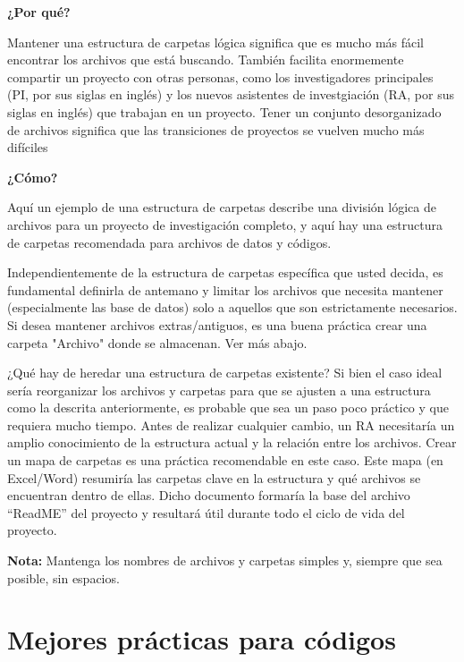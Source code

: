 \documentclass[11pt,en]{elegantpaper}
\begin{document}
\textbf{¿Por qué?} 

Mantener una estructura de carpetas lógica significa que es mucho más fácil encontrar los archivos que está buscando. También facilita enormemente compartir un proyecto con otras personas, como los investigadores principales (PI, por sus siglas en inglés) y los nuevos asistentes de investgiación (RA, por sus siglas en inglés) que trabajan en un proyecto. Tener un conjunto desorganizado de archivos significa que las transiciones de proyectos se vuelven mucho más difíciles


\textbf{¿Cómo?}

Aquí un ejemplo de una estructura de carpetas describe una división lógica de archivos para un proyecto de investigación completo, y aquí hay una estructura de carpetas recomendada para archivos de datos y códigos. 

Independientemente de la estructura de carpetas específica que usted decida, es fundamental definirla de antemano y limitar los archivos que necesita mantener (especialmente las base de datos) solo a aquellos que son estrictamente necesarios. Si desea mantener archivos extras/antiguos, es una buena práctica crear una carpeta "Archivo" donde se almacenan. Ver más abajo.

¿Qué hay de heredar una estructura de carpetas existente? Si bien el caso ideal sería reorganizar los archivos y carpetas para que se ajusten a una estructura como la descrita anteriormente, es probable que sea un paso poco práctico y que requiera mucho tiempo. Antes de realizar cualquier cambio, un RA necesitaría un amplio conocimiento de la estructura actual y la relación entre los archivos. Crear un mapa de carpetas es una práctica recomendable en este caso. Este mapa (en Excel/Word) resumiría las carpetas clave en la estructura y qué archivos se encuentran dentro de ellas. Dicho documento formaría la base del archivo ``ReadME'' del proyecto y resultará útil durante todo el ciclo de vida del proyecto.

\textbf{Nota:} Mantenga los nombres de archivos y carpetas simples y, siempre que sea posible, sin espacios.
\section{Mejores prácticas para códigos}

\end{document}
